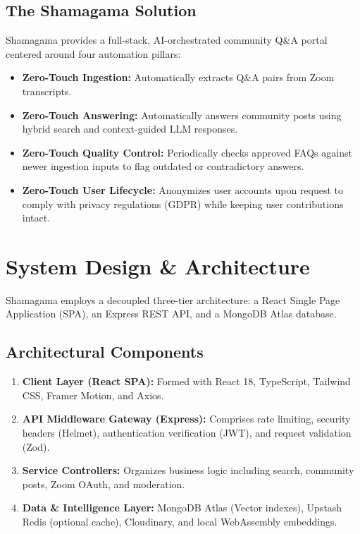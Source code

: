 \documentclass[11pt,a4paper]{article}
\begin{document}
\subsection{The Shamagama Solution}
Shamagama provides a full-stack, AI-orchestrated community Q\&A portal centered around four automation pillars:
\begin{itemize}
    \item \textbf{Zero-Touch Ingestion:} Automatically extracts Q\&A pairs from Zoom transcripts.
    \item \textbf{Zero-Touch Answering:} Automatically answers community posts using hybrid search and context-guided LLM responses.
    \item \textbf{Zero-Touch Quality Control:} Periodically checks approved FAQs against newer ingestion inputs to flag outdated or contradictory answers.
    \item \textbf{Zero-Touch User Lifecycle:} Anonymizes user accounts upon request to comply with privacy regulations (GDPR) while keeping user contributions intact.
\end{itemize}

\section{System Design \& Architecture}
Shamagama employs a decoupled three-tier architecture: a React Single Page Application (SPA), an Express REST API, and a MongoDB Atlas database.

\subsection{Architectural Components}
\begin{enumerate}
    \item \textbf{Client Layer (React SPA):} Formed with React 18, TypeScript, Tailwind CSS, Framer Motion, and Axios.
    \item \textbf{API Middleware Gateway (Express):} Comprises rate limiting, security headers (Helmet), authentication verification (JWT), and request validation (Zod).
    \item \textbf{Service Controllers:} Organizes business logic including search, community posts, Zoom OAuth, and moderation.
    \item \textbf{Data \& Intelligence Layer:} MongoDB Atlas (Vector indexes), Upstash Redis (optional cache), Cloudinary, and local WebAssembly embeddings.
\end{enumerate}
\end{document}
